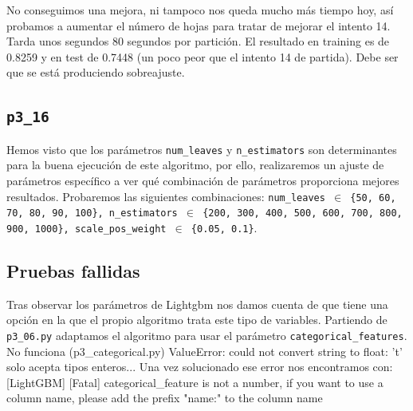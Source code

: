 \documentclass[a4paper, 20pt]{article}
\begin{document}
No conseguimos una mejora, ni tampoco nos queda mucho más tiempo hoy, así probamos a aumentar el número de hojas para tratar de mejorar el intento 14. Tarda unos segundos 80 segundos por partición. El resultado en training es de 0.8259 y en test de 0.7448 (un poco peor que el intento 14 de partida). Debe ser que se está produciendo sobreajuste.

\subsection{\texttt{p3\_16}}

Hemos visto que los parámetros \texttt{num\_leaves} y \texttt{n\_estimators} son determinantes para la buena ejecución de este algoritmo, por ello, realizaremos un ajuste de parámetros específico a ver qué combinación de parámetros proporciona mejores resultados. Probaremos las siguientes combinaciones: \texttt{num\_leaves $\in$ \{50, 60, 70, 80, 90, 100\}, n\_estimators $\in$ \{200, 300, 400, 500, 600, 700, 800, 900, 1000\},
scale\_pos\_weight $\in$ \{0.05, 0.1\}}.


\subsection{Pruebas fallidas}
Tras observar los parámetros de Lightgbm nos damos cuenta de que tiene una opción en la que el propio algoritmo trata este tipo de variables. Partiendo de \texttt{p3\_06.py} adaptamos el algoritmo para usar el parámetro \texttt{categorical\_features}.
 No funciona (p3\_categorical.py)
 ValueError: could not convert string to float: 't'
 solo acepta tipos enteros... Una vez solucionado ese error nos encontramos con:
 [LightGBM] [Fatal] categorical\_feature is not a number,
if you want to use a column name,
please add the prefix "name:" to the column name
\end{document}
